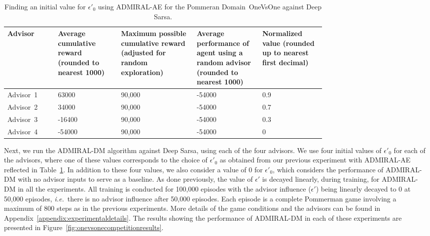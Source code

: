 \documentclass[jair, twoside,11pt,theapa]{article}
\begin{document}
\begin{table}[h]
\begin{center}
 \begin{tabular}{||p{0.12 \linewidth} |p{0.15 \linewidth} |p{0.18 \linewidth} |p{0.15 \linewidth} | p{0.15 \linewidth}||}  
 \hline
 Advisor & Average cumulative reward (rounded to nearest 1000) & Maximum possible cumulative reward (adjusted for random exploration) & Average performance of agent using a random advisor (rounded to nearest 1000) & Normalized value (rounded up to nearest first decimal)\\ [0.5ex] 
 \hline\hline
 Advisor~1 & 63000 & 90,000 & -54000 & 0.9 \\ 
 \hline
 Advisor~2 & 34000 & 90,000 & -54000 & 0.7  \\
 \hline
 Advisor~3 & -16400 & 90,000 & -54000 & 0.3  \\
 \hline
 Advisor~4 & -54000 & 90,000 & -54000 & 0  \\[1ex] 
 \hline
\end{tabular}
\caption{Finding an initial value for $\epsilon'_0$ using ADMIRAL-AE for the Pommeran Domain~OneVsOne against Deep Sarsa.}
\label{tab:pommermanvsdeepsarsaepsilon}
\end{center}
\end{table}





Next, we run the ADMIRAL-DM algorithm against Deep Sarsa, using each of the four advisors. We use four initial values of $\epsilon'_0$ for each of the advisors, where one of these values  corresponds to the choice of $\epsilon'_0$ as obtained from our previous experiment with ADMIRAL-AE reflected in Table~\ref{tab:pommermanvsdeepsarsaepsilon}. In addition to these four values, we also consider a value of 0 for $\epsilon'_0$, which considers the performance of ADMIRAL-DM with no advisor inputs to serve as a baseline. As done previously, the value of $\epsilon'$ is decayed linearly, during training, for ADMIRAL-DM in all the experiments. All training is conducted for 100,000 episodes with the advisor influence ($\epsilon'$) being linearly decayed to 0 at 50,000 episodes, \emph{i.e.}~there is no advisor influence after 50,000 episodes. Each episode is a complete Pommerman game involving a maximum of 800 steps as in the previous experiments. More details of the game conditions and the advisors can be found in Appendix~\ref{appendix:experimentaldetails}. The results showing the performance of ADMIRAL-DM in each of these experiments are presented in Figure~\ref{fig:onevsonecompetitionresults}. 
\end{document}
